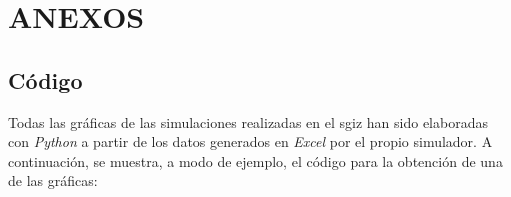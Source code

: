 
\newpage
\section*{ANEXOS} \label{sec:anexos} %
{} %

\renewcommand{\thesubsection}{\Alph{subsection}} %
\renewcommand{\thetable}{\Alph{subsection}.\arabic{table}}
\renewcommand{\thefigure}{\Alph{subsection}.\arabic{figure}}
\renewcommand{\thecode}{\Alph{subsection}.\arabic{code}}

\setcounter{subsection}{0}
\setcounter{table}{0}
\setcounter{figure}{0}

\subsection{Código} \label{sec:codigo}

Todas las gráficas de las simulaciones realizadas en el \acrshort{sgiz} han sido elaboradas con \textit{Python} a partir de los datos generados en \textit{Excel} por el propio simulador. A continuación, se muestra, a modo de ejemplo, el código para la obtención de una de las gráficas:

\vspace{-5pt}

